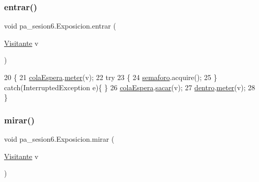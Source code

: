 \subsubsection{\texorpdfstring{entrar()}{entrar()}}
{\footnotesize\ttfamily void pa\+\_\+sesion6.\+Exposicion.\+entrar (\begin{DoxyParamCaption}\item[{\mbox{\hyperlink{classpa__sesion6_1_1_visitante}{Visitante}}}]{v }\end{DoxyParamCaption})\hspace{0.3cm}{\ttfamily [inline]}}


\begin{DoxyCode}
20     \{
21         \mbox{\hyperlink{classpa__sesion6_1_1_exposicion_a3bf69f7216a0de4d66e64da055479f16}{colaEspera}}.\mbox{\hyperlink{classpa__sesion6_1_1_lista_threads_a624e853e2ebdf3ccf90692fee902183e}{meter}}(v);
22         \textcolor{keywordflow}{try}
23         \{
24             \mbox{\hyperlink{classpa__sesion6_1_1_exposicion_a85f365853b70ab8959d994128fd1b30a}{semaforo}}.acquire();
25         \} \textcolor{keywordflow}{catch}(InterruptedException e)\{ \}
26         \mbox{\hyperlink{classpa__sesion6_1_1_exposicion_a3bf69f7216a0de4d66e64da055479f16}{colaEspera}}.\mbox{\hyperlink{classpa__sesion6_1_1_lista_threads_a750595ae1fea92fc8270776a0aebaa58}{sacar}}(v);
27         \mbox{\hyperlink{classpa__sesion6_1_1_exposicion_ab6a124ffce7020f2703c668f813c557a}{dentro}}.\mbox{\hyperlink{classpa__sesion6_1_1_lista_threads_a624e853e2ebdf3ccf90692fee902183e}{meter}}(v);
28     \}
\end{DoxyCode}
\mbox{\label{classpa__sesion6_1_1_exposicion_a88cad59e332e16a6a199ca599d70239f}} 
\subsubsection{\texorpdfstring{mirar()}{mirar()}}
{\footnotesize\ttfamily void pa\+\_\+sesion6.\+Exposicion.\+mirar (\begin{DoxyParamCaption}\item[{\mbox{\hyperlink{classpa__sesion6_1_1_visitante}{Visitante}}}]{v }\end{DoxyParamCaption})\hspace{0.3cm}{\ttfamily [inline]}}


